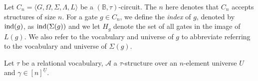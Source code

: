 \documentclass[../paper.tex]{subfiles}
\begin{document}
Let $C_n = \langle G, \Omega, \Sigma, \Lambda, L \rangle$ be a $(\mathbb{B},
\tau)$-circuit. The $n$ here denotes that $C_n$ accepts structures of size $n$.
For a gate $g \in C_n$, we define the \emph{index} of $g$, denoted by $\text{\upshape ind}(g)$,
as $\text{\upshape ind}(\Sigma(g))$ and we let $H_g$ denote the set of all gates in the image
of $L(g)$. We also refer to the vocabulary and universe of $g$ to abbreviate
referring to the vocabulary and universe of $\Sigma(g)$.









Let $\tau$ be a relational vocabulary, %
$\mathcal{A}$ a $\tau$-structure over an $n$-element universe $U$ and $\gamma
\in [n]^{\underline{U}}$.
\end{document}
